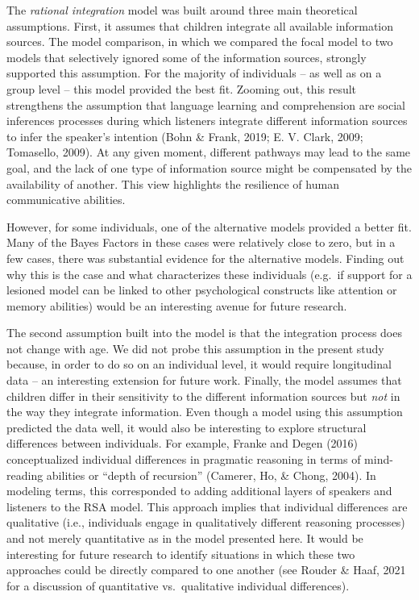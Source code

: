 \documentclass[
  man,floatsintext]{apa6}
\begin{document}
The \emph{rational integration} model was built around three main theoretical assumptions. First, it assumes that children integrate all available information sources. The model comparison, in which we compared the focal model to two models that selectively ignored some of the information sources, strongly supported this assumption. For the majority of individuals -- as well as on a group level -- this model provided the best fit. Zooming out, this result strengthens the assumption that language learning and comprehension are social inferences processes during which listeners integrate different information sources to infer the speaker's intention (Bohn \& Frank, 2019; E. V. Clark, 2009; Tomasello, 2009). At any given moment, different pathways may lead to the same goal, and the lack of one type of information source might be compensated by the availability of another. This view highlights the resilience of human communicative abilities.

However, for some individuals, one of the alternative models provided a better fit. Many of the Bayes Factors in these cases were relatively close to zero, but in a few cases, there was substantial evidence for the alternative models. Finding out why this is the case and what characterizes these individuals (e.g.~if support for a lesioned model can be linked to other psychological constructs like attention or memory abilities) would be an interesting avenue for future research.

The second assumption built into the model is that the integration process does not change with age. We did not probe this assumption in the present study because, in order to do so on an individual level, it would require longitudinal data -- an interesting extension for future work. Finally, the model assumes that children differ in their sensitivity to the different information sources but \emph{not} in the way they integrate information. Even though a model using this assumption predicted the data well, it would also be interesting to explore structural differences between individuals. For example, Franke and Degen (2016) conceptualized individual differences in pragmatic reasoning in terms of mind-reading abilities or ``depth of recursion'' (Camerer, Ho, \& Chong, 2004). In modeling terms, this corresponded to adding additional layers of speakers and listeners to the RSA model. This approach implies that individual differences are qualitative (i.e., individuals engage in qualitatively different reasoning processes) and not merely quantitative as in the model presented here. It would be interesting for future research to identify situations in which these two approaches could be directly compared to one another (see Rouder \& Haaf, 2021 for a discussion of quantitative vs.~qualitative individual differences).
\end{document}
